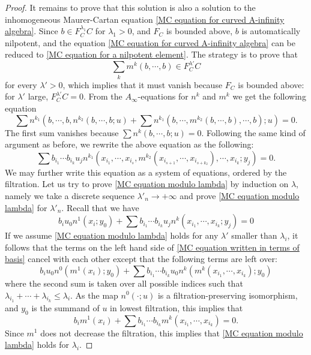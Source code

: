 \documentclass{amsart}
\numberwithin{equation}{section}
\numberwithin{figure}{section}
\begin{document}
\begin{proof}
	It remains to prove that this solution is also a solution to the inhomogeneous Maurer-Cartan equation \eqref{MC equation for curved A-infinity algebra}. Since $b \in F_{C}^{\lambda_{1}}C$ for $\lambda_{1} > 0$, and $F_{C}$ is bounded above, $b$ is automatically nilpotent, and the equation \eqref{MC equation for curved A-infinity algebra} can be reduced to \eqref{MC equation for a nilpotent element}. The strategy is to prove that
\begin{equation}\label{MC equation modulo lambda}
\sum_{k} m^{k}(b, \cdots, b) \in F_{C}^{\lambda'}C
\end{equation}
for every $\lambda' > 0$, which implies that it must vanish because $F_{C}$ is bounded above: for $\lambda'$ large, $F_{C}^{\lambda'}C = 0$.
From the $A_{\infty}$-equations for $n^{k}$ and $m^{k}$ we get the following equation
\begin{equation}
\sum n^{k_{1}}(b, \cdots, b, n^{k_{2}}(b, \cdots, b; u) + \sum n^{k_{1}}(b, \cdots, m^{k_{2}}(b, \cdots, b), \cdots, b); u) = 0.
\end{equation}
The first sum vanishes because $\sum n^{k}(b, \cdots, b; u) = 0$. Following the same kind of argument as before, we rewrite the above equation as the following:
\begin{equation}\label{MC equation written in terms of basis}
\sum b_{i_{1}} \cdots b_{i_{k}} u_{j} n^{k_{1}}(x_{i_{1}}, \cdots, x_{i_{s}}, m^{k_{2}}(x_{i_{s+1}}, \cdots, x_{i_{s+k_{2}}}), \cdots, x_{i_{k}}; y_{j}) = 0.
\end{equation}
We may further write this equation as a system of equations, ordered by the filtration.
Let us try to prove \eqref{MC equation modulo lambda} by induction on $\lambda$, namely we take a discrete sequence $\lambda'_{n} \to +\infty$ and prove \eqref{MC equation modulo lambda} for $\lambda'_{n}$. Recall that we have
\begin{equation}
b_{i} u_{0} n^{1}(x_{i}; y_{0}) + \sum b_{i_{1}} \cdots b_{i_{k}} u_{j} n^{k}(x_{i_{1}}, \cdots, x_{i_{k}}; y_{j}) = 0
\end{equation}
If we assume \eqref{MC equation modulo lambda} holds for any $\lambda'$ smaller than $\lambda_{i}$, it follows that the terms on the left hand side of \eqref{MC equation written in terms of basis} cancel with each other except that the following terms are left over:
\begin{equation}
b_{i} u_{0} n^{0}(m^{1}(x_{i}); y_{0}) + \sum b_{i_{1}} \cdots b_{i_{k}} u_{0} n^{k}(m^{k}(x_{i_{1}}, \cdots, x_{i_{k}}); y_{0})
\end{equation}
where the second sum is taken over all possible indices such that $\lambda_{i_{1}} + \cdots + \lambda_{i_{k}} \le \lambda_{i}$. As the map $n^{0}(\cdot; u)$ is a filtration-preserving isomorphism, and $y_{0}$ is the summand of $u$ in lowest filtration, this implies that
\begin{equation*}
b_{i} m^{1}(x_{i}) + \sum b_{i_{1}} \cdots b_{i_{k}} m^{k}(x_{i_{1}}, \cdots, x_{i_{k}}) = 0.
\end{equation*}
Since $m^{1}$ does not decrease the filtration, this implies that \eqref{MC equation modulo lambda} holds for $\lambda_{i}$. \par
\end{proof}
\end{document}
